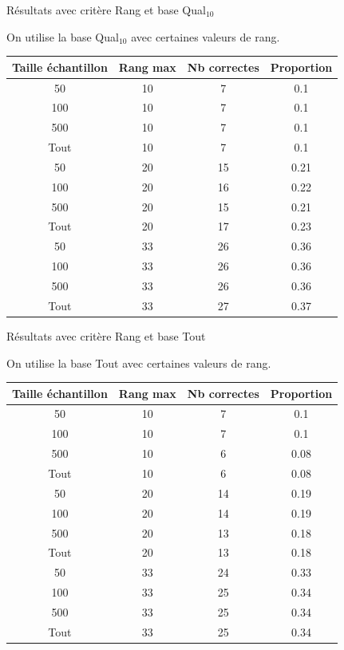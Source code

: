 \documentclass{beamer}
\begin{document}
\begin{frame}{Résultats avec critère Rang et base Qual$_{10}$}

On utilise la base Qual$_{10}$ avec certaines valeurs de rang.
\begin{tabular}{|c|c|c|c|}
   \hline
   Taille échantillon & Rang max & Nb correctes & Proportion\\
   \hline
   50 & 10  & 7 & 0.1  \\
   \hline
   100 & 10  & 7 & 0.1  \\
   \hline
   500 & 10  & 7 & 0.1  \\
   \hline
   Tout & 10 & 7 & 0.1 \\
   \hline
   50 & 20  & 15 & 0.21  \\
   \hline
   100 & 20 & 16 & 0.22  \\
   \hline
   500 & 20 & 15 & 0.21  \\
   \hline
   Tout & 20 & 17 & 0.23 \\
   \hline
   50 & 33 & 26 & 0.36  \\
   \hline
   100 & 33 & 26 & 0.36  \\
   \hline
   500 & 33 & 26 & 0.36  \\
   \hline
   Tout & 33 & 27 & 0.37 \\
\end{tabular}
\end{frame}

\begin{frame}{Résultats avec critère Rang et base Tout}

On utilise la base Tout avec certaines valeurs de rang.
\begin{tabular}{|c|c|c|c|}
   \hline
   Taille échantillon & Rang max & Nb correctes & Proportion\\
   \hline
   50 & 10  & 7 & 0.1  \\
   \hline
   100 & 10  & 7 & 0.1  \\
   \hline
   500 & 10  & 6 & 0.08  \\
   \hline
   Tout & 10 & 6 & 0.08 \\
   \hline
   50 & 20  & 14 & 0.19  \\
   \hline
   100 & 20 & 14 & 0.19  \\
   \hline
   500 & 20 & 13 & 0.18  \\
   \hline
   Tout & 20 & 13 & 0.18 \\
   \hline
   50 & 33 & 24 & 0.33  \\
   \hline
   100 & 33 & 25 & 0.34  \\
   \hline
   500 & 33 & 25 & 0.34  \\
   \hline
   Tout & 33 & 25 & 0.34 \\
\end{tabular}
\end{frame}
\end{document}
